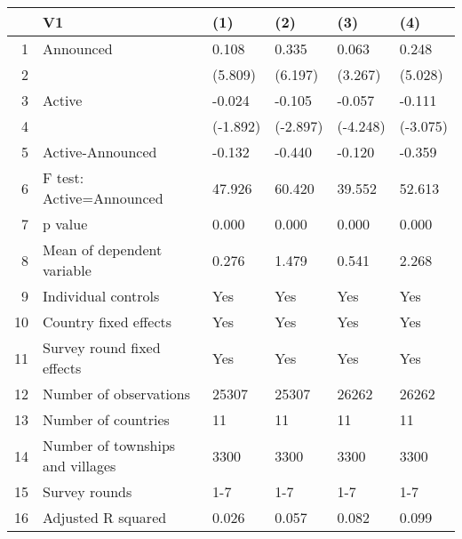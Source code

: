 \begin{table}[ht]
\centering
\begin{tabular}{rlllll}
  \hline
 & V1 & (1) & (2) & (3) & (4) \\ 
  \hline
1 & Announced & 0.108 & 0.335 & 0.063 & 0.248 \\ 
  2 &  & (5.809) & (6.197) & (3.267) & (5.028) \\ 
  3 & Active & -0.024 & -0.105 & -0.057 & -0.111 \\ 
  4 &  & (-1.892) & (-2.897) & (-4.248) & (-3.075) \\ 
  5 & Active-Announced & -0.132 & -0.440 & -0.120 & -0.359 \\ 
  6 & F test: Active=Announced & 47.926 & 60.420 & 39.552 & 52.613 \\ 
  7 & p value & 0.000 & 0.000 & 0.000 & 0.000 \\ 
  8 & Mean of dependent variable & 0.276 & 1.479 & 0.541 & 2.268 \\ 
  9 & Individual controls & Yes & Yes & Yes & Yes \\ 
  10 & Country fixed effects & Yes & Yes & Yes & Yes \\ 
  11 & Survey round fixed effects & Yes & Yes & Yes & Yes \\ 
  12 & Number of observations & 25307 & 25307 & 26262 & 26262 \\ 
  13 & Number of countries & 11 & 11 & 11 & 11 \\ 
  14 & Number of townships and villages & 3300 & 3300 & 3300 & 3300 \\ 
  15 & Survey rounds & 1-7 & 1-7 & 1-7 & 1-7 \\ 
  16 & Adjusted R squared & 0.026 & 0.057 & 0.082 & 0.099 \\ 
   \hline
\end{tabular}
\end{table}
